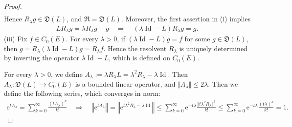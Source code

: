 \documentclass{article}
\numberwithin{equation}{section}
\newcommand{\e}{\mathrm{e}}
\DeclareMathOperator{\id}{Id}
\theoremstyle{plain}
\theoremstyle{definition}
\begin{document}
\begin{proof}
\begin{align*}
\end{align*}
Hence $R_\lambda g\in\mathfrak{D}(L)$, and $\mathfrak{R}=\mathfrak{D}(L)$. Moreover, the first assertion in (i) implies
\begin{align*}
	LR_\lambda g = \lambda R_\lambda g - g\quad\Rightarrow\quad (\lambda\id-L)R_\lambda g = g.
\end{align*}
(iii) Fix $f\in C_0(E)$. For every $\lambda>0$, if $(\lambda\id - L)g=f$ for some $g\in\mathfrak{D}(L)$, then $g=R_\lambda(\lambda\id - L)g=R_\lambda f$. Hence the resolvent $R_\lambda$ is uniquely determined by inverting the operator $\lambda\id-L$, which is defined on $C_0(E)$.

For every $\lambda>0$, we define $A_\lambda:=\lambda R_\lambda L = \lambda^2R_\lambda - \lambda\id$. Then $A_\lambda:\mathfrak{D}(L)\to C_0(E)$ is a bounded linear operator, and $\Vert A_\lambda\Vert\leq 2\lambda$. Then we define the following series, which converges in norm:
\begin{align*}
	\e^{tA_\lambda}=\sum_{k=0}^\infty\frac{(tA_\lambda)^k}{k!}\quad\Rightarrow\quad \left\Vert\e^{tA_\lambda}\right\Vert=\left\Vert\e^{t\lambda^2R_\lambda-\lambda\id}\right\Vert\leq\sum_{k=0}^\infty\e^{-t\lambda}\frac{\Vert t\lambda^2R_\lambda\Vert^k}{k!}\leq\sum_{k=0}^\infty\e^{-t\lambda}\frac{(t\lambda)^k}{k!}= 1.
\end{align*}


\end{proof}
\end{document}
